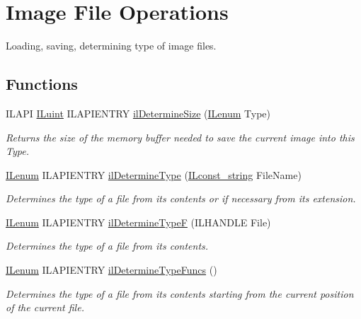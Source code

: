 \hypertarget{group__file}{\section{Image File Operations}
\label{group__file}
}


Loading, saving, determining type of image files.  


\subsection*{Functions}
\begin{DoxyCompactItemize}
\item 
I\+L\+A\+P\+I \hyperlink{group__il__types_gaff8e86a1072c8d7cfe387fb87c6ed8e1}{I\+Luint} I\+L\+A\+P\+I\+E\+N\+T\+R\+Y \hyperlink{group__file_ga1a1701a1dbec445a4e184a189707d2cd}{il\+Determine\+Size} (\hyperlink{group__il__types_ga62ca73445716183ef42b1f3906a45ed0}{I\+Lenum} Type)
\begin{DoxyCompactList}\small\item\em Returns the size of the memory buffer needed to save the current image into this Type. \end{DoxyCompactList}\item 
\hyperlink{group__il__types_ga62ca73445716183ef42b1f3906a45ed0}{I\+Lenum} I\+L\+A\+P\+I\+E\+N\+T\+R\+Y \hyperlink{group__file_ga910c033593bbdb2d6018ecbe2aeab089}{il\+Determine\+Type} (\hyperlink{group__il__types_ga1aa1edc3eb344e14acacb02bade24a5a}{I\+Lconst\+\_\+string} File\+Name)
\begin{DoxyCompactList}\small\item\em Determines the type of a file from its contents or if necessary from its extension. \end{DoxyCompactList}\item 
\hyperlink{group__il__types_ga62ca73445716183ef42b1f3906a45ed0}{I\+Lenum} I\+L\+A\+P\+I\+E\+N\+T\+R\+Y \hyperlink{group__file_gad4fad086e3c82e04e022254f8e4b8492}{il\+Determine\+Type\+F} (I\+L\+H\+A\+N\+D\+L\+E File)
\begin{DoxyCompactList}\small\item\em Determines the type of a file from its contents. \end{DoxyCompactList}\item 
\hyperlink{group__il__types_ga62ca73445716183ef42b1f3906a45ed0}{I\+Lenum} I\+L\+A\+P\+I\+E\+N\+T\+R\+Y \hyperlink{group__file_ga4b9f6b7a5c4a97a916efa67d2ce64546}{il\+Determine\+Type\+Funcs} ()
\begin{DoxyCompactList}\small\item\em Determines the type of a file from its contents starting from the current position of the current file. \end{DoxyCompactList}\item 

\end{DoxyCompactItemize}
